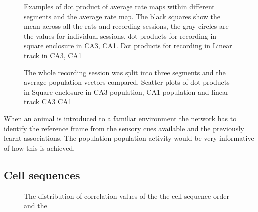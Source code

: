 \begin{figure}[htb!]
\centering
{}
\caption[Population Vector time course]{Examples of dot product of average rate maps within different segments and the average rate map. The black squares show the mean across all the rats and recording sessions, the gray circles are the values for individual sessions, dot products for recording in square enclosure in  CA3,  CA1. Dot products for recording in Linear track in  CA3,  CA1}
\end{figure}

\begin{figure}[htb!]
\centering
{}
\caption[CA3 Population Vector analysis]{The whole recording session was split into three segments and the average population vectors compared. Scatter plots of dot products in Square enclosure in  CA3 population,  CA1 population and linear track  CA3  CA1}
\end{figure}

When an animal is introduced to a familiar environment the network has to identify the reference frame from the sensory cues available and the previously learnt associations. The population population activity would be very informative of how this is achieved.\\[2cm]

\newpage

\subsection{Cell sequences}
\begin{figure}[HTB!]
\centering
{}
\caption[CA3 post-trial sleep template match analysis]{The distribution of correlation values of the the cell sequence order and the }
\label{tmcorr}
\end{figure}
\section{}
